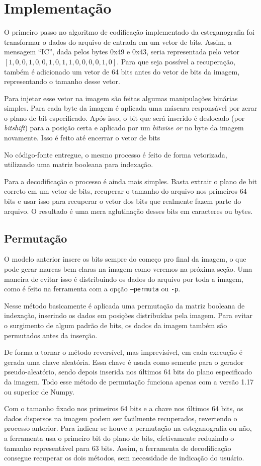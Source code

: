 \section{Implementação} \label{sec:implementacao}

O primeiro passo no algoritmo de codificação implementado da esteganografia foi transformar o dados do arquivo de entrada em um vetor de bits. Assim, a mensagem ``IC'', dada pelos bytes 0x49 e 0x43, seria representada pelo vetor $[1, 0, 0, 1, 0, 0, 1, 0, 1, 1, 0, 0, 0, 0, 1, 0]$. Para que seja possível a recuperação, também é adicionado um vetor de 64 bits antes do vetor de bits da imagem, representando o tamanho desse vetor.

Para injetar esse vetor na imagem são feitas algumas manipulações binárias simples. Para cada byte da imagem é aplicada uma máscara responsável por zerar o plano de bit especificado. Após isso, o bit que será inserido é deslocado (por \textit{bitshift}) para a posição certa e aplicado por um \textit{bitwise or} no byte da imagem novamente. Isso é feito até encerrar o vetor de bits

No código-fonte entregue, o mesmo processo é feito de forma vetorizada, utilizando uma matriz booleana para indexação.

Para a decodificação o processo é ainda mais simples. Basta extrair o plano de bit correto em um vetor de bits, recuperar o tamanho do arquivo nos primeiros 64 bits e usar isso para recuperar o vetor dos bits que realmente fazem parte do arquivo. O resultado é uma mera aglutinação desses bits em caracteres ou bytes.

\subsection{Permutação} \label{sec:permutacao}

O modelo anterior insere os bits sempre do começo pro final da imagem, o que pode gerar marcas bem claras na imagem como veremos na próxima seção. Uma maneira de evitar isso é distribuindo os dados do arquivo por toda a imagem, como é feito na ferramenta com a opção \texttt{--permuta} ou \texttt{-p}.

Nesse método basicamente é aplicada uma permutação da matriz booleana de indexação, inserindo os dados em posições distribuídas pela imagem. Para evitar o surgimento de algum padrão de bits, os dados da imagem também são permutados antes da inserção.

De forma a tornar o método reversível, mas imprevisível, em cada execução é gerada uma chave aleatória. Essa chave é usada como semente para o gerador pseudo-aleatório, sendo depois inserida nos últimos 64 bits do plano especificado da imagem. Todo esse método de permutação funciona apenas com a versão 1.17 ou superior de Numpy.

Com o tamanho fixado nos primeiros 64 bits e a chave nos últimos 64 bits, os dados dispersos na imagem podem ser facilmente recuperados, revertendo o processo anterior. Para indicar se houve a permutação na esteganografia ou não, a ferramenta usa o primeiro bit do plano de bits, efetivamente reduzindo o tamanho representável para 63 bits. Assim, a ferramenta de decodificação consegue recuperar os dois métodos, sem necessidade de indicação do usuário.
